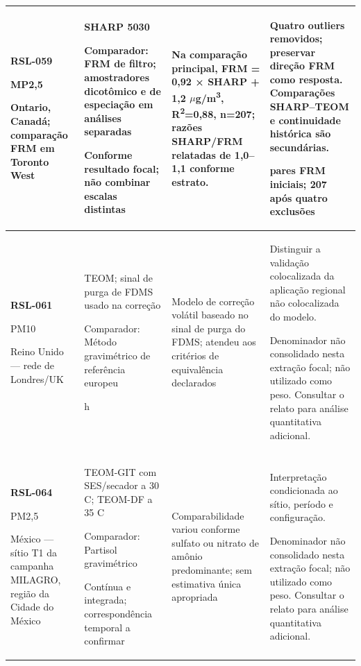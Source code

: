 \begin{longtable}{|P{0.18\textwidth}|P{0.25\textwidth}|P{0.28\textwidth}|P{\arrayrulewidth\relax}|}
\textbf{RSL-059}\par\textcite{rsl059}\par MP2,5\par Ontario, Canadá; comparação FRM em Toronto West & SHARP 5030\par\medskip Comparador: FRM de filtro; amostradores dicotômico e de especiação em análises separadas\par\medskip Conforme resultado focal; não combinar escalas distintas & Na comparação principal, FRM = 0,92 × SHARP + 1,2 \ensuremath{\mu}g/m\textsuperscript{3}, R\textsuperscript{2}=0,88, n=207; razões SHARP/FRM relatadas de 1,0--1,1 conforme estrato. & Quatro outliers removidos; preservar direção FRM como resposta. Comparações SHARP--TEOM e continuidade histórica são secundárias.\par{} pares FRM iniciais; 207 após quatro exclusões\\\hline
\textbf{RSL-061}\par\textcite{rsl061}\par PM10\par Reino Unido --- rede de Londres/UK & TEOM; sinal de purga de FDMS usado na correção\par\medskip Comparador: Método gravimétrico de referência europeu\par{} h & Modelo de correção volátil baseado no sinal de purga do FDMS; atendeu aos critérios de equivalência declarados & Distinguir a validação colocalizada da aplicação regional não colocalizada do modelo.\par\medskip Denominador não consolidado nesta extração focal; não utilizado como peso. Consultar o relato para análise quantitativa adicional.\\\hline
\textbf{RSL-064}\par\textcite{rsl064}\par PM2,5\par México --- sítio T1 da campanha MILAGRO, região da Cidade do México & TEOM-GIT com SES/secador a 30 \textdegree{}C; TEOM-DF a 35 \textdegree{}C\par\medskip Comparador: Partisol gravimétrico\par\medskip Contínua e integrada; correspondência temporal a confirmar & Comparabilidade variou conforme sulfato ou nitrato de amônio predominante; sem estimativa única apropriada & Interpretação condicionada ao sítio, período e configuração.\par\medskip Denominador não consolidado nesta extração focal; não utilizado como peso. Consultar o relato para análise quantitativa adicional.\\\hline

\end{longtable}
